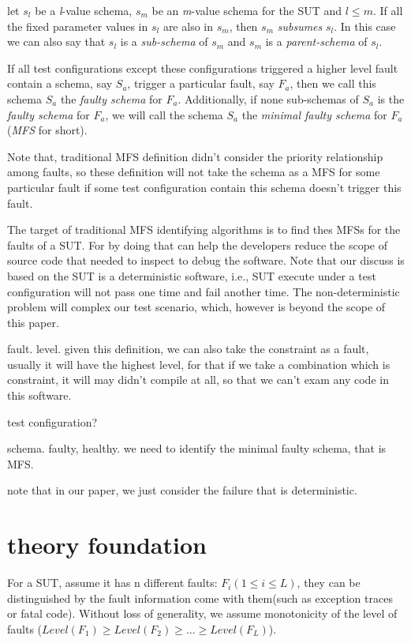 \documentclass{sig-alternate}
\begin{document}
\begin{definition}
let $s_{l}$ be a \emph{l}-value schema, $s_{m}$ be an \emph{m}-value schema for the SUT and $l \leq m$. If all the fixed parameter values in $s_{l}$ are also in $s_{m}$, then $s_{m}$ \emph{subsumes} $s_{l}$. In this case we can also say that $s_{l}$ is a \emph{sub-schema} of $s_{m}$ and $s_{m}$ is a \emph{parent-schema} of $s_{l}$.
\end{definition}

\begin{definition}
If all test configurations except these configurations triggered a higher level fault contain a schema, say $S_{a}$, trigger a particular fault, say $F_{a}$, then we call this schema $S_{a}$ the \emph{faulty schema} for $F_{a}$. Additionally, if none sub-schemas of $S_{a}$ is the \emph{faulty schema} for $F_{a}$, we will call the schema $S_{a}$ the \emph{minimal faulty schema} for $F_{a}$(\emph{MFS} for short).

Note that, traditional MFS definition didn't consider the priority relationship among faults, so these definition will not take the schema as a MFS for some particular fault if some test configuration contain this schema doesn't trigger this fault.
\end{definition}

The target of traditional MFS identifying algorithms is to find thes MFSs for the faults of a SUT. For by doing that can help the developers reduce the scope of source code that needed to inspect to debug the software. Note that our discuss is based on the SUT is a deterministic software, i.e., SUT execute under a test configuration will not pass one time and fail another time. The non-deterministic problem will complex our test scenario, which, however is beyond the scope of this paper.



fault. level.
given this definition, we can also take the constraint as a fault, usually it will have the highest level, for that if we take a combination which is constraint, it will may didn't compile at all, so that we can't exam any code in this software.

test configuration?

schema.
faulty, healthy.
we need to identify the minimal faulty schema, that is MFS.

note that in our paper, we just consider the failure that is deterministic.

\section{theory foundation}
For a SUT, assume it has n different faults: $F_{i} ( 1 \leq i \leq L)$, they can be distinguished by the fault information come with them(such as exception traces or fatal code). Without loss of generality, we assume monotonicity of the level of faults ($Level(F_{1}) \geq Level(F_{2}) \geq ... \geq Level(F_{L}) $).
\end{document}
